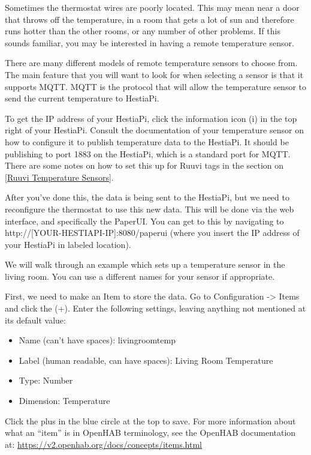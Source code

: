 Sometimes the thermostat wires are poorly located. This may mean near a door
that throws off the temperature, in a room that gets a lot of sun and therefore
runs hotter than the other rooms, or any number of other problems. If this
sounds familiar, you may be interested in having a remote temperature sensor.

There are many different models of remote temperature sensors to choose from.
The main feature that you will want to look for when selecting a sensor is that
it supports MQTT. MQTT is the protocol that will allow the temperature sensor
to send the current temperature to HestiaPi.

To get the IP address of your HestiaPi, click the information icon (i) in the
top right of your HestiaPi. Consult the documentation of your temperature
sensor on how to configure it to publish temperature data to the HestiaPi. It
should be publishing to port 1883 on the HestiaPi, which is a standard port for
MQTT. There are some notes on how to set this up for Ruuvi tags in the section
on \ref{Ruuvi Temperature Sensors}.

After you've done this, the data is being sent to the HestiaPi, but we need to
reconfigure the thermostat to use this new data. This will be done via the web
interface, and specifically the PaperUI. You can get to this by navigating to
http://[YOUR-HESTIAPI-IP]:8080/paperui (where you insert the IP address of your
HestiaPi in labeled location).

We will walk through an example which sets up a temperature sensor in the living
room. You can use a different names for your sensor if appropriate.

First, we need to make an Item to store the data. Go to Configuration -> Items
and click the (+).  Enter the following settings, leaving anything not mentioned
at its default value:

\begin{itemize}
\item Name (can’t have spaces): livingroomtemp
\item Label (human readable, can have spaces): Living Room Temperature
\item Type: Number
\item Dimension: Temperature
\end{itemize} 

Click the plus in the blue circle at the top to save. For more information
about what an ``item'' is in OpenHAB terminology, see the OpenHAB documentation
at: \url{https://v2.openhab.org/docs/concepts/items.html}

